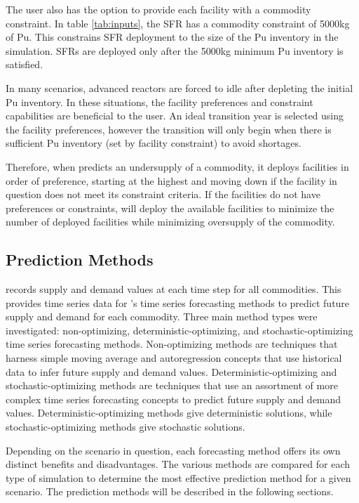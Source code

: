 The user also has the option to provide each facility with a 
commodity constraint. 
In table \ref{tab:inputs}, 
the \gls{SFR} has a commodity constraint of 5000kg of Pu. 
This constrains \gls{SFR} deployment to the size of the Pu inventory 
in the simulation. 
\glspl{SFR} are deployed only after the 5000kg minimum Pu inventory 
is satisfied. 

In many scenarios, advanced reactors are forced to idle after 
depleting the initial Pu inventory. 
In these situations, the facility preferences and constraint capabilities 
are beneficial to the user. 
An ideal transition year is selected using the facility 
preferences, however the transition will only begin when there 
is sufficient Pu inventory (set by facility constraint) 
to avoid shortages. 

Therefore, when \deploy predicts an undersupply of a commodity, 
it deploys facilities in order of preference, starting at 
the highest and moving down if the facility in question does 
not meet its constraint criteria.
If the facilities do not have preferences or constraints, \deploy 
will deploy the available facilities to minimize the number of 
deployed facilities while minimizing oversupply of the commodity.

\subsection{Prediction Methods}
\deploy records supply and demand values at each time step for all 
commodities. 
This provides time series data for \deploy's time series 
forecasting methods to predict future supply and demand for each 
commodity.  
Three main method types were investigated: non-optimizing, 
deterministic-optimizing, and stochastic-optimizing
time series forecasting methods.
Non-optimizing methods are techniques that harness 
simple moving average and autoregression concepts that use 
historical data to infer future supply and demand values. 
Deterministic-optimizing and stochastic-optimizing 
methods are techniques 
that use an assortment of more complex time series forecasting 
concepts to predict future supply and demand values. 
Deterministic-optimizing methods give deterministic solutions,
while stochastic-optimizing methods give stochastic solutions. 

Depending on the scenario in question, each forecasting method 
offers its own distinct benefits and disadvantages.
The various methods are compared for each type of simulation 
to determine the most effective prediction method for 
a given scenario.  
The prediction methods will be described in the following 
sections. 

